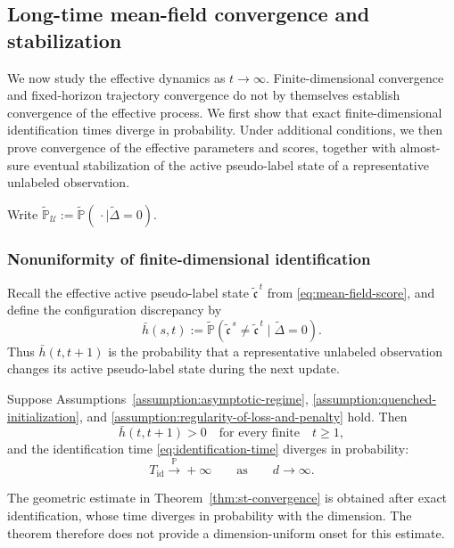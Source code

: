 \subsection{Long-time mean-field convergence and stabilization}
\label{subsec:long-time}

We now study the effective dynamics as $t\to\infty$.
Finite-dimensional convergence and fixed-horizon trajectory
convergence do not by themselves establish convergence of the
effective process. We first show that exact finite-dimensional
identification times diverge in probability. Under additional
conditions, we then prove convergence of the effective parameters
and scores, together with almost-sure eventual stabilization of
the active pseudo-label state of a representative unlabeled
observation.

Write
$\tilde{\mathbb P}_{\mathcal U}
:=\tilde{\mathbb P}(\,\cdot\mid\tilde\Delta=0)$.

\subsubsection{Nonuniformity of finite-dimensional identification}

Recall the effective active pseudo-label state $\tilde{\mathfrak c}^{\,t}$ from \eqref{eq:mean-field-score}, 
and define the configuration discrepancy by
\[
    \bar h(s,t)
    :=
    \tilde{\mathbb P}
        (\tilde{\mathfrak c}^{\,s}
            \neq\tilde{\mathfrak c}^{\,t} \mid \tilde \Delta = 0).
\]
Thus $\bar h(t,t+1)$ is the probability that a representative
unlabeled observation changes its active pseudo-label state
during the next update.

\begin{proposition}
\label{prop:identification-time-divergence}
Suppose Assumptions~\ref{assumption:asymptotic-regime},
\ref{assumption:quenched-initialization}, and
\ref{assumption:regularity-of-loss-and-penalty} hold.
Then
\[
    \bar h(t,t+1)>0
    \quad \text{for every finite} \quad t\geq1,
\]
and the identification time \eqref{eq:identification-time} diverges in probability:
\[
    T_{\mathrm{id}}
    \xrightarrow{\mathbb P}+\infty
    \qquad\text{as} \qquad d\to\infty.
\]
\end{proposition}

The geometric estimate in Theorem~\ref{thm:st-convergence}
is obtained after exact identification, whose time diverges
in probability with the dimension.
The theorem therefore does not provide a dimension-uniform
onset for this estimate.


